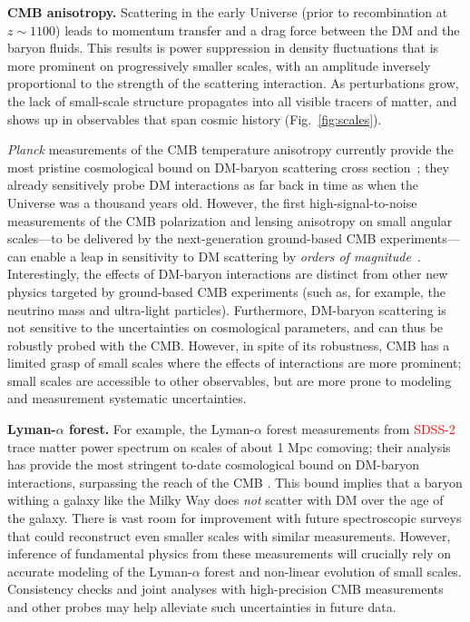 \documentclass[12pt]{article}
\newcommand{\vg}[1] {\textcolor{red}{#1}}
\begin{document}
\textbf{CMB anisotropy.} 
Scattering in the early Universe (prior to recombination at $z\sim 1100$) leads to momentum transfer and a drag force between the DM and the baryon fluids.
This results is power suppression in density fluctuations that is more prominent on progressively smaller scales, with an amplitude inversely proportional to the strength of the scattering interaction.
As perturbations grow, the lack of small-scale structure propagates into all visible tracers of matter, and shows up in observables that span cosmic history (Fig.~\ref{fig:scales}).

\textit{Planck} measurements of the CMB temperature anisotropy currently provide the most pristine cosmological bound on DM-baryon scattering cross section~\cite{Boddy:2018kfv,Gluscevic:2017ywp,Boddy:2018wzy,Xu:2018efh,Slatyer:2018aqg,Dvorkin:2013cea}; they already sensitively probe DM interactions as far back in time as when the Universe was a thousand years old.
However, the first high-signal-to-noise measurements of the CMB polarization and lensing anisotropy on small angular scales---to be delivered by the next-generation ground-based CMB experiments---can enable a leap in sensitivity to DM scattering by \textit{orders of magnitude}~\cite{Li:2018zdm}.
Interestingly, the effects of DM-baryon interactions are distinct from other new physics targeted by ground-based CMB experiments (such as, for example, the neutrino mass and ultra-light particles).
Furthermore, DM-baryon scattering is not sensitive to the uncertainties on cosmological parameters, and can thus be robustly probed with the CMB.
However, in spite of its robustness, CMB has a limited grasp of small scales where the effects of interactions are more prominent; small scales are accessible to other observables, but are more prone to modeling and measurement systematic uncertainties.

\textbf{Lyman-$\alpha$ forest.} 
For example, the Lyman-$\alpha$ forest measurements from \vg{SDSS-2} trace matter power spectrum on scales of about 1 Mpc comoving; their analysis has provide the most stringent to-date cosmological bound on DM-baryon interactions, surpassing the reach of the CMB  \cite{Dvorkin:2013cga,Slatyer:2018aqg,Xu:2018efh}.
This bound implies that a baryon withing a galaxy like the Milky Way does \textit{not} scatter with DM over the age of the galaxy.
There is vast room for improvement with future spectroscopic surveys that could reconstruct even smaller scales with similar measurements.
However, inference of fundamental physics from these measurements will crucially rely on accurate modeling of the Lyman-$\alpha$ forest and non-linear evolution of small scales.
Consistency checks and joint analyses with high-precision CMB measurements and other probes may help alleviate such uncertainties in future data.
\end{document}
